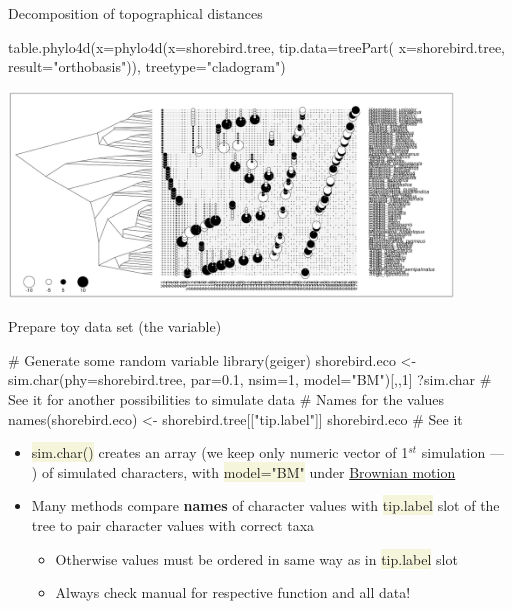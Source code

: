 \documentclass[compress, xelatex, 11pt, xcolor=svgnames, aspectratio=169,
	hyperref={
		bookmarks=true,
		unicode=true,
		colorlinks=true,
		pdftitle={Molecular data in R},
		plainpages=false,
		pdfauthor={Vojtech Zeisek},
		pdfsubject={Course about phylogeny and evolution in R},
		pdfcreator={XeLaTeX},
		pdfkeywords={R, evolution, phylogeny, molecular data},
		linkcolor=Crimson, %
		anchorcolor=Magenta, %
		citecolor=Magenta, %
		filecolor=Magenta, %
		menucolor=Magenta, %
		urlcolor=DodgerBlue, %
		},
	url={hyphens, lowtilde} %
	]{beamer}
\renewcommand{\texttt}[1]{\colorbox{Beige}{{\ttfamily #1}}}
\begin{document}
\begin{frame}[fragile]{Decomposition of topographical distances}
	\begin{spluscode}
    table.phylo4d(x=phylo4d(x=shorebird.tree, tip.data=treePart(
      x=shorebird.tree, result="orthobasis")), treetype="cladogram")
	\end{spluscode}
	\begin{center}
		\includegraphics[height=5.5cm]{shorebird_tree_decomp.png}
	\end{center}
\end{frame}

\begin{frame}[fragile]{Prepare toy data set (the variable)}
	\begin{spluscode}
    # Generate some random variable
    library(geiger)
    shorebird.eco <- sim.char(phy=shorebird.tree, par=0.1, nsim=1,
      model="BM")[,,1]
    ?sim.char # See it for another possibilities to simulate data
    # Names for the values
    names(shorebird.eco) <- shorebird.tree[["tip.label"]]
    shorebird.eco # See it
	\end{spluscode}
	\begin{itemize}
		\item \texttt{sim.char()} creates an array (we keep only numeric vector of 1$^{st}$ simulation --- \texttt{[,,1]}) of simulated characters, with \texttt{model="BM"} under \href{https://en.wikipedia.org/wiki/Brownian_motion}{Brownian motion}
		\item Many methods compare \textbf{names} of character values with \texttt{tip.label} slot of the tree to pair character values with correct taxa
		\begin{itemize}
			\item Otherwise values must be ordered in same way as in \texttt{tip.label} slot
			\item \alert{Always check manual for respective function and all data!}
		\end{itemize}
	\end{itemize}
\end{frame}
\end{document}
